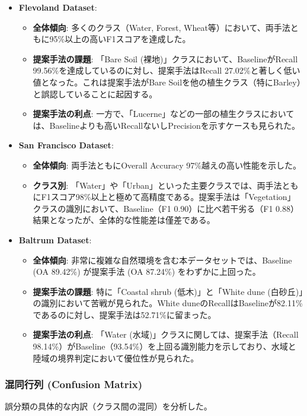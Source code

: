 \begin{itemize}
    \item \textbf{Flevoland Dataset}:
    \begin{itemize}
        \item \textbf{全体傾向}: 多くのクラス（Water, Forest, Wheat等）において、両手法ともに95\%以上の高いF1スコアを達成した。
        \item \textbf{提案手法の課題}: 「Bare Soil (裸地)」クラスにおいて、BaselineがRecall 99.56\%を達成しているのに対し、提案手法はRecall 27.02\%と著しく低い値となった。これは提案手法がBare Soilを他の植生クラス（特にBarley）と誤認していることに起因する。
        \item \textbf{提案手法の利点}: 一方で、「Lucerne」などの一部の植生クラスにおいては、Baselineよりも高いRecallないしPrecisionを示すケースも見られた。
    \end{itemize}

    \item \textbf{San Francisco Dataset}:
    \begin{itemize}
        \item \textbf{全体傾向}: 両手法ともにOverall Accuracy 97\%越えの高い性能を示した。
        \item \textbf{クラス別}: 「Water」や「Urban」といった主要クラスでは、両手法ともにF1スコア98\%以上と極めて高精度である。提案手法は「Vegetation」クラスの識別において、Baseline（F1 0.90）に比べ若干劣る（F1 0.88）結果となったが、全体的な性能差は僅差である。
    \end{itemize}

    \item \textbf{Baltrum Dataset}:
    \begin{itemize}
        \item \textbf{全体傾向}: 非常に複雑な自然環境を含む本データセットでは、Baseline (OA 89.42\%) が提案手法 (OA 87.24\%) をわずかに上回った。
        \item \textbf{提案手法の課題}: 特に「Coastal shrub (低木)」と「White dune (白砂丘)」の識別において苦戦が見られた。White duneのRecallはBaselineが82.11\%であるのに対し、提案手法は52.71\%に留まった。
        \item \textbf{提案手法の利点}: 「Water (水域)」クラスに関しては、提案手法（Recall 98.14\%）がBaseline（93.54\%）を上回る識別能力を示しており、水域と陸域の境界判定において優位性が見られた。
    \end{itemize}
\end{itemize}

\subsubsection{混同行列 (Confusion Matrix)}
誤分類の具体的な内訳（クラス間の混同）を分析した。

